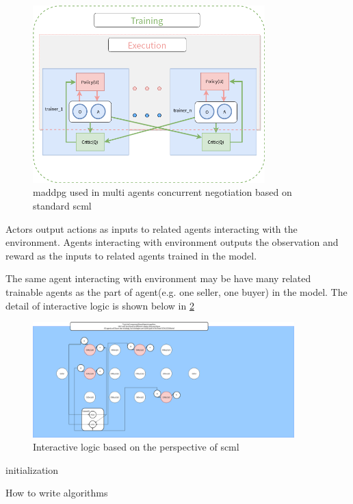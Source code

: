 \begin{figure}[htbp]
\centering
\includegraphics[width=0.80\textwidth]{./images/scml-maddpg.png}
\caption{maddpg used in multi agents concurrent negotiation based on standard \gls{scml}}
\label{fig:method-maddpg-scml}
\end{figure}

Actors output actions as inputs to related agents interacting with the environment. Agents interacting with environment outputs the observation and reward as the inputs to related agents trained in the model. 

The same agent interacting with environment may be have many related trainable agents as the part of agent(e.g. one seller, one buyer) in the model. The detail of interactive logic is shown below in \ref{fig:interacting-logic-maddpg-scml}

\begin{figure}[htbp]
\centering
\includegraphics[width=0.90\textwidth]{./images/scnk.png}
\caption{Interactive logic based on the perspective of \gls{scml}}
\label{fig:interacting-logic-maddpg-scml}
\end{figure}

\begin{algorithm}[H]
  \SetAlgoLined

  initialization\;
  \caption{How to write algorithms}
\end{algorithm}

